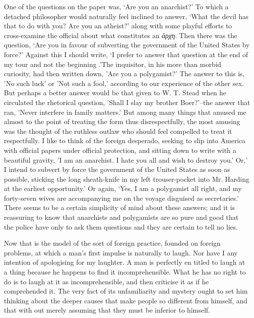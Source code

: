 \documentclass{book}
\begin{document}
One of the questions on the paper was, ‘Are you an anarchist?’ To which a detached philosopher would naturally feel inclined to answer, ‘What the devil has that to do with you? Are you an atheist?’ along with some playful efforts to cross-examine the official about what constitutes an \emph{άρχη}. Then there was the question, ‘Are you in favour of subverting the government of the United States by force?’ Against this I should write, ‘I prefer to answer that question at the end of my tour and not the beginning .’The inquisitor, in his more than morbid curiosity, had then written down, ’Are you a polygamist?’ The answer to this is, ’No such luck’ or ’Not such a fool,’ according to our experience of the other sex. But perhaps a better answer would be that given to W. T. Stead when he circulated the rhetorical question, ’Shall I slay my brother Boer?’–the answer that ran, ’Never interfere in family matters.’ But among many things that amused me almost to the point of treating the form thus disrespectfully, the most amusing was the thought of the ruthless outlaw who should feel compelled to treat it respectfully. I like to think of the foreign desperado, seeking to slip into America with official papers under official protection, and sitting down to write with a beautiful gravity, ’I am an anarchist. I hate you all and wish to destroy you.’ Or,’ I intend to subvert by force the government of the United States as soon as possible, sticking the long sheath-knife in my left trouser-pocket into Mr. Harding at the earliest opportunity.’ Or again, ‘Yes, I am a polygamist all right, and my forty-seven wives are accompanying me on the voyage disguised as secretaries.’ There seems to be a certain simplicity of mind about these answers; and it is reassuring to know that anarchists and polygamists are so pure and good that the police have only to ask them questions and they are certain to tell no lies.

Now that is the model of the sort of foreign practice, founded on foreign problems, at which a man’s first impulse is naturally to laugh. Nor have I any intention of apologising for my laughter. A man is perfectly en titled to laugh at a thing because he happens to find it incomprehensible. What he has no right to do is to laugh at it as incomprehensible, and then criticise it as if he comprehended it. The very fact of its unfamiliarity and mystery ought to set him thinking about the deeper causes that make people so different from himself, and that with out merely assuming that they must be inferior to himself.
\end{document}
